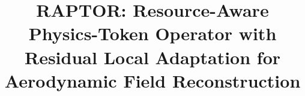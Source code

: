 \documentclass[a4paper,fleqn]{cas-sc}
\begin{document}
\let\WriteBookmarks\relax
\def\floatpagepagefraction{1}
\def\textpagefraction{.001}

\shorttitle{}    

\shortauthors{}  

\title [mode = title]{RAPTOR: Resource-Aware Physics-Token Operator with Residual Local Adaptation for Aerodynamic Field Reconstruction}  



%
%
%
%
%
%
%
%
%
%
%
%
%
%
%
%


\end{document}

